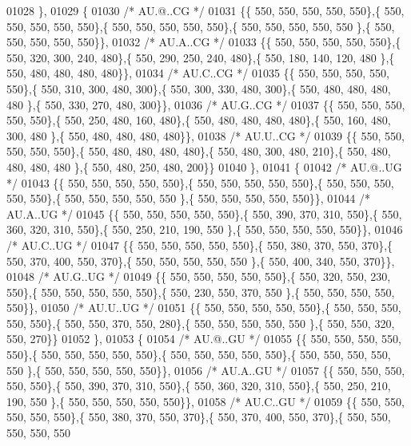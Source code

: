 \begin{DoxyCode}
01028 \},
01029 \{
01030 \textcolor{comment}{/* AU.@..CG */}
01031 \{\{ 550, 550, 550, 550, 550\},\{ 550, 550, 550, 550, 550\},\{ 550, 550, 550, 550, 550\},\{ 550, 550, 550, 550, 550
      \},\{ 550, 550, 550, 550, 550\}\},
01032 \textcolor{comment}{/* AU.A..CG */}
01033 \{\{ 550, 550, 550, 550, 550\},\{ 550, 320, 300, 240, 480\},\{ 550, 290, 250, 240, 480\},\{ 550, 180, 140, 120, 480
      \},\{ 550, 480, 480, 480, 480\}\},
01034 \textcolor{comment}{/* AU.C..CG */}
01035 \{\{ 550, 550, 550, 550, 550\},\{ 550, 310, 300, 480, 300\},\{ 550, 300, 330, 480, 300\},\{ 550, 480, 480, 480, 480
      \},\{ 550, 330, 270, 480, 300\}\},
01036 \textcolor{comment}{/* AU.G..CG */}
01037 \{\{ 550, 550, 550, 550, 550\},\{ 550, 250, 480, 160, 480\},\{ 550, 480, 480, 480, 480\},\{ 550, 160, 480, 300, 480
      \},\{ 550, 480, 480, 480, 480\}\},
01038 \textcolor{comment}{/* AU.U..CG */}
01039 \{\{ 550, 550, 550, 550, 550\},\{ 550, 480, 480, 480, 480\},\{ 550, 480, 300, 480, 210\},\{ 550, 480, 480, 480, 480
      \},\{ 550, 480, 250, 480, 200\}\}
01040 \},
01041 \{
01042 \textcolor{comment}{/* AU.@..UG */}
01043 \{\{ 550, 550, 550, 550, 550\},\{ 550, 550, 550, 550, 550\},\{ 550, 550, 550, 550, 550\},\{ 550, 550, 550, 550, 550
      \},\{ 550, 550, 550, 550, 550\}\},
01044 \textcolor{comment}{/* AU.A..UG */}
01045 \{\{ 550, 550, 550, 550, 550\},\{ 550, 390, 370, 310, 550\},\{ 550, 360, 320, 310, 550\},\{ 550, 250, 210, 190, 550
      \},\{ 550, 550, 550, 550, 550\}\},
01046 \textcolor{comment}{/* AU.C..UG */}
01047 \{\{ 550, 550, 550, 550, 550\},\{ 550, 380, 370, 550, 370\},\{ 550, 370, 400, 550, 370\},\{ 550, 550, 550, 550, 550
      \},\{ 550, 400, 340, 550, 370\}\},
01048 \textcolor{comment}{/* AU.G..UG */}
01049 \{\{ 550, 550, 550, 550, 550\},\{ 550, 320, 550, 230, 550\},\{ 550, 550, 550, 550, 550\},\{ 550, 230, 550, 370, 550
      \},\{ 550, 550, 550, 550, 550\}\},
01050 \textcolor{comment}{/* AU.U..UG */}
01051 \{\{ 550, 550, 550, 550, 550\},\{ 550, 550, 550, 550, 550\},\{ 550, 550, 370, 550, 280\},\{ 550, 550, 550, 550, 550
      \},\{ 550, 550, 320, 550, 270\}\}
01052 \},
01053 \{
01054 \textcolor{comment}{/* AU.@..GU */}
01055 \{\{ 550, 550, 550, 550, 550\},\{ 550, 550, 550, 550, 550\},\{ 550, 550, 550, 550, 550\},\{ 550, 550, 550, 550, 550
      \},\{ 550, 550, 550, 550, 550\}\},
01056 \textcolor{comment}{/* AU.A..GU */}
01057 \{\{ 550, 550, 550, 550, 550\},\{ 550, 390, 370, 310, 550\},\{ 550, 360, 320, 310, 550\},\{ 550, 250, 210, 190, 550
      \},\{ 550, 550, 550, 550, 550\}\},
01058 \textcolor{comment}{/* AU.C..GU */}
01059 \{\{ 550, 550, 550, 550, 550\},\{ 550, 380, 370, 550, 370\},\{ 550, 370, 400, 550, 370\},\{ 550, 550, 550, 550, 550

\end{DoxyCode}
